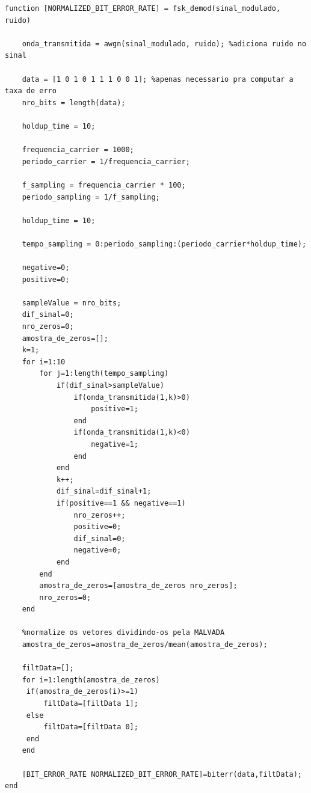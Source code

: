 \documentclass[11pt,a4paper]{report}
\begin{document}
	\begin{verbatim}
function [NORMALIZED_BIT_ERROR_RATE] = fsk_demod(sinal_modulado, ruido)

    onda_transmitida = awgn(sinal_modulado, ruido); %adiciona ruido no sinal

    data = [1 0 1 0 1 1 1 0 0 1]; %apenas necessario pra computar a taxa de erro
    nro_bits = length(data);

    holdup_time = 10;

    frequencia_carrier = 1000; 
    periodo_carrier = 1/frequencia_carrier;

    f_sampling = frequencia_carrier * 100;
    periodo_sampling = 1/f_sampling;

    holdup_time = 10;
    
    tempo_sampling = 0:periodo_sampling:(periodo_carrier*holdup_time);

    negative=0;
    positive=0;

    sampleValue = nro_bits;
    dif_sinal=0;
    nro_zeros=0;
    amostra_de_zeros=[];
    k=1;
    for i=1:10
        for j=1:length(tempo_sampling)
            if(dif_sinal>sampleValue)
                if(onda_transmitida(1,k)>0)
                    positive=1;    
                end
                if(onda_transmitida(1,k)<0)
                    negative=1;
                end
            end
            k++;
            dif_sinal=dif_sinal+1;
            if(positive==1 && negative==1)
                nro_zeros++;
                positive=0;
                dif_sinal=0;
                negative=0;
            end
        end
        amostra_de_zeros=[amostra_de_zeros nro_zeros];
        nro_zeros=0;     
    end

    %normalize os vetores dividindo-os pela MALVADA
    amostra_de_zeros=amostra_de_zeros/mean(amostra_de_zeros);

    filtData=[];
    for i=1:length(amostra_de_zeros)
     if(amostra_de_zeros(i)>=1)
         filtData=[filtData 1];
     else
         filtData=[filtData 0];
     end
    end

    [BIT_ERROR_RATE NORMALIZED_BIT_ERROR_RATE]=biterr(data,filtData);
end
	
	\end{verbatim}
	
\end{document}
